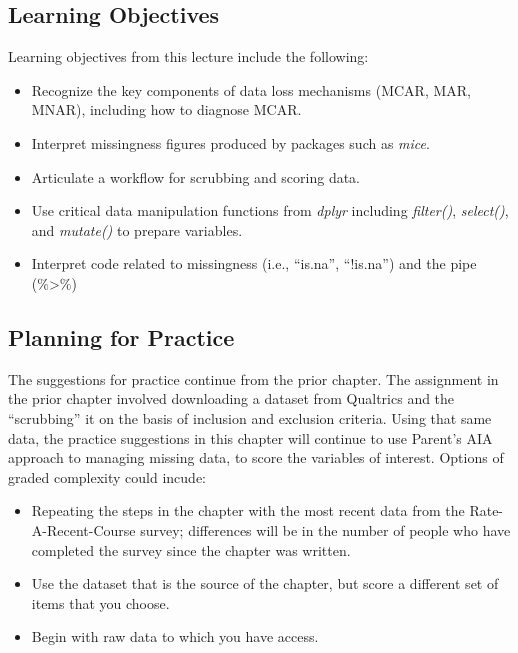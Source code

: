 \documentclass[
  11pt,
]{book}
\providecommand{\tightlist}{%
  \setlength{\itemsep}{0pt}\setlength{\parskip}{0pt}}
\begin{document}
\hypertarget{learning-objectives-1}{%
\subsection{Learning Objectives}\label{learning-objectives-1}}

Learning objectives from this lecture include the following:

\begin{itemize}
\tightlist
\item
  Recognize the key components of data loss mechanisms (MCAR, MAR, MNAR), including how to diagnose MCAR.
\item
  Interpret missingness figures produced by packages such as \emph{mice}.
\item
  Articulate a workflow for scrubbing and scoring data.
\item
  Use critical data manipulation functions from \emph{dplyr} including \emph{filter()}, \emph{select()}, and \emph{mutate()} to prepare variables.
\item
  Interpret code related to missingness (i.e., ``is.na'', ``!is.na'') and the pipe (\%\textgreater\%)
\end{itemize}

\hypertarget{planning-for-practice-1}{%
\subsection{Planning for Practice}\label{planning-for-practice-1}}

The suggestions for practice continue from the prior chapter. The assignment in the prior chapter involved downloading a dataset from Qualtrics and the ``scrubbing'' it on the basis of inclusion and exclusion criteria. Using that same data, the practice suggestions in this chapter will continue to use Parent's \citeyearpar{parent_handling_2013} AIA approach to managing missing data, to score the variables of interest. Options of graded complexity could incude:

\begin{itemize}
\tightlist
\item
  Repeating the steps in the chapter with the most recent data from the Rate-A-Recent-Course survey; differences will be in the number of people who have completed the survey since the chapter was written.
\item
  Use the dataset that is the source of the chapter, but score a different set of items that you choose.
\item
  Begin with raw data to which you have access.
\end{itemize}
\end{document}
